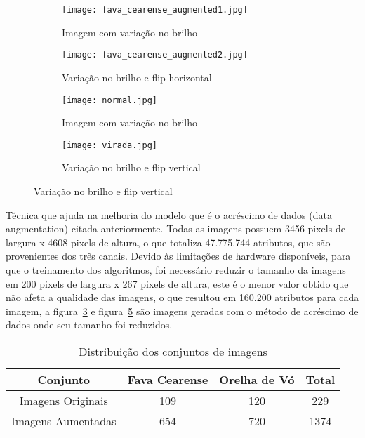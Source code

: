 \begin{figure}[H]
\centering
\begin{subfigure}[b]{0.3\textwidth}
\centering
\texttt{[image: fava\_cearense\_augmented1.jpg]}
\caption{Imagem com variação no brilho}
\label{fig:fava_cearense_augmented-1}
\end{subfigure}
\begin{subfigure}[b]{0.3\textwidth}
\centering
\texttt{[image: fava\_cearense\_augmented2.jpg]}
\caption{Variação no brilho e flip horizontal}
\label{fig:fava_cearense_augmented-2}
\end{subfigure}

\begin{subfigure}[b]{0.3\textwidth}
\centering
\texttt{[image: normal.jpg]}
\caption{Imagem com variação no brilho}
\label{fig:geometrica_fava_cearense_augmented-1}
\end{subfigure}
\begin{subfigure}[b]{0.3\textwidth}
\centering
\texttt{[image: virada.jpg]}
\caption{Variação no brilho e flip vertical}
\label{fig:geometrica_fava_cearense_augmented-2}
\end{subfigure}
\end{figure}

Técnica que ajuda na melhoria do modelo que é o acréscimo de dados (data augmentation) citada anteriormente. Todas as imagens possuem 3456 pixels de largura x 4608 pixels de altura, o que totaliza 47.775.744 atributos, que são provenientes dos três canais. Devido às limitações de hardware disponíveis, para que o treinamento dos algoritmos, foi necessário reduzir o tamanho da imagens em 200 pixels de largura x 267 pixels de altura, este é o menor valor obtido que não afeta a qualidade das imagens, o que resultou em 160.200 atributos para cada imagem, a figura~\ref{fig:geometrica_fava_cearense_augmented-1} e figura~\ref{fig:geometrica_fava_cearense_augmented-2} são imagens geradas com o método de acréscimo de dados onde seu tamanho foi reduzidos.

\begin{table}[H]
\centering
\begin{tabular}{ |c|c|c|c| } 
\hline
\textbf{Conjunto} & \textbf{Fava Cearense} & \textbf{Orelha de Vó} & \textbf{Total}  \\ [0.5ex]
\hline Imagens Originais & 109 & 120 & 229 \\
\hline Imagens Aumentadas & 654 & 720 & 1374 \\ \hline
\end{tabular}
\caption{Distribuição dos conjuntos de imagens}
\label{tabela:dataset1}
\end{table}

